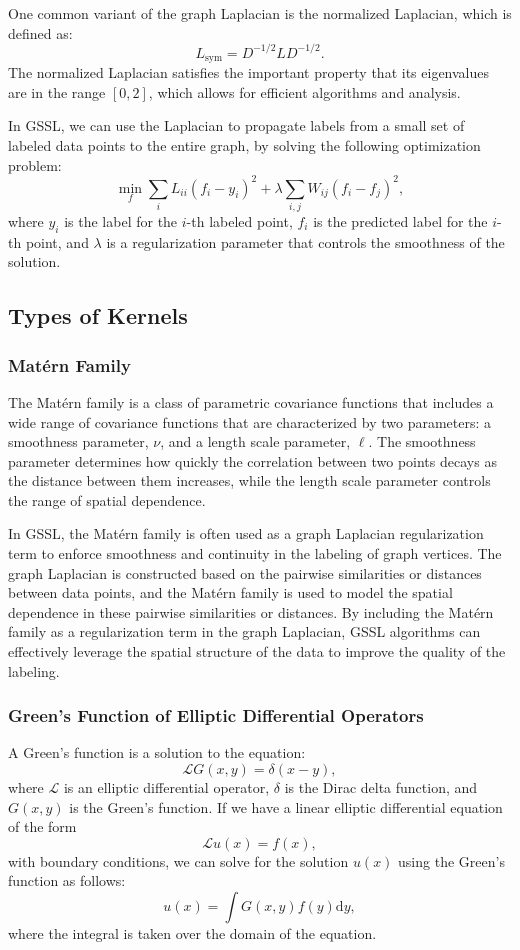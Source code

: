 \documentclass[12pt]{amsart}
\begin{document}
One common variant of the graph Laplacian is the normalized Laplacian, which is defined as:
$$ L_{\text{sym}} = D^{-1/2} L D^{-1/2}. $$
The normalized Laplacian satisfies the important property that its eigenvalues are in the range $[0, 2]$, which allows for efficient algorithms and analysis. 

In GSSL, we can use the Laplacian to propagate labels from a small set of labeled data points to the entire graph, by solving the following optimization problem:
$$ \min_f \sum_i L_{ii} (f_i - y_i)^2 + \lambda \sum_{i,j} W_{ij} (f_i - f_j)^2, $$
where $y_i$ is the label for the $i$-th labeled point, $f_i$ is the predicted label for the $i$-th point, and $\lambda$ is a regularization parameter that controls the smoothness of the solution. 

\subsection{Types of Kernels}
\subsubsection{Mat\'{e}rn Family}
The Mat\'{e}rn family is a class of parametric covariance functions that includes a wide range of covariance functions that are characterized by two parameters: a smoothness parameter, $\nu$, and a length scale parameter, $\ell$. The smoothness parameter determines how quickly the correlation between two points decays as the distance between them increases, while the length scale parameter controls the range of spatial dependence. 

In GSSL, the Mat\'{e}rn family is often used as a graph Laplacian regularization term to enforce smoothness and continuity in the labeling of graph vertices. The graph Laplacian is constructed based on the pairwise similarities or distances between data points, and the Mat\'{e}rn family is used to model the spatial dependence in these pairwise similarities or distances. By including the Mat\'{e}rn family as a regularization term in the graph Laplacian, GSSL algorithms can effectively leverage the spatial structure of the data to improve the quality of the labeling.
\subsubsection{Green's Function of Elliptic Differential Operators}
A Green's function is a solution to the equation:
$$\mathcal{L} G(x,y) = \delta(x-y),$$
where $\mathcal{L}$ is an elliptic differential operator, $\delta$ is the Dirac delta function, and $G(x,y)$ is the Green's function. If we have a linear elliptic differential equation of the form
$$\mathcal{L} u(x) = f(x),$$
with boundary conditions, we can solve for the solution $u(x)$ using the Green's function as follows:
$$u(x) = \int G(x,y) f(y) \mathrm{d}y,$$
where the integral is taken over the domain of the equation.
\end{document}
